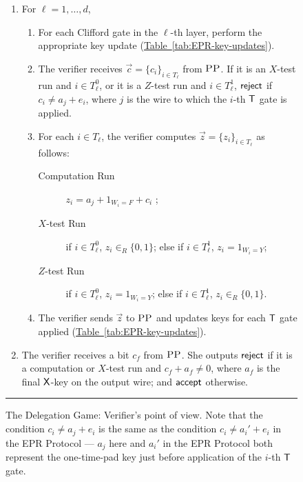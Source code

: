 \documentclass[11pt]{article}
\numberwithin{equation}{section}
\theoremstyle{definition}
\theoremstyle{plain}
\newcommand{\expref}[2]{\hyperref[#2]{#1~\ref{#2}}}
\newcommand{\pp}{\textsc{PP}}
\begin{document}
\begin{figure}[H]
\begin{enumerate}
\item For $\ell=1,\dots,d$, 
  \begin{enumerate}
\itemsep=-2pt   %
  \item For each Clifford gate in the $\ell$-th layer, perform the appropriate
    key update (\expref{Table}{tab:EPR-key-updates}).
  \item The verifier receives $\vec{c} = \{c_i\}_{i\in T_{\ell}}$ from $\pp$. If
it is an $X$-test run and $i\in T_\ell^0$, or it is 
a $Z$-test run and $i\in T_\ell^1$, $\sf reject$ if $c_i\neq a_{j}+ e_i$, where $j$ is the wire to which the $i$-th $\sf T$ gate is applied.
\item For each $i\in T_\ell$, the verifier computes $\vec{z}=\{z_i\}_{i\in T_\ell}$ as follows: 
\begin{description}
\item[Computation Run] $z_i=a_{j}+ 1_{W_i=F} + c_i$ ;
\item[$X$-test Run] if $i\in T_\ell^0$, $z_i\in_R\{0,1\}$; else if $i\in T_\ell^1$, $z_i=1_{W_i=Y}$;
\item[$Z$-test Run] if $i\in T_\ell^0$, $z_i=1_{W_i=Y}$; else if $i\in T_\ell^1$, $z_i\in_R\{0,1\}$.
\end{description}
\item The verifier sends $\vec{z}$ to $\pp$ and updates keys for each $\sf T$
  gate applied (\expref{Table}{tab:EPR-key-updates}).
\end{enumerate} 
\item The verifier receives a bit $c_f$ from $\pp$. She outputs $\sf reject$ if
it is a computation or $X$-test run and $c_f+ a_f\neq 0$, where $a_f$ is the final $\sf X$-key on the output wire; and $\sf accept$ otherwise.
\end{enumerate}
\vspace{-0.08cm} 
\rule[2ex]{\textwidth}{0.5pt}\vspace{-.5cm}     %
\caption{The Delegation Game: Verifier's point of view. Note that the condition $c_i\neq a_j+e_i$ is the same as the condition $c_i\neq a_i'+e_i$ in the EPR Protocol --- $a_j$ here and $a_i'$ in the EPR Protocol both represent the one-time-pad key just before application of the $i$-th $\sf T$ gate.}\label{fig:leash-protocol-V}
\end{figure}
\end{document}
